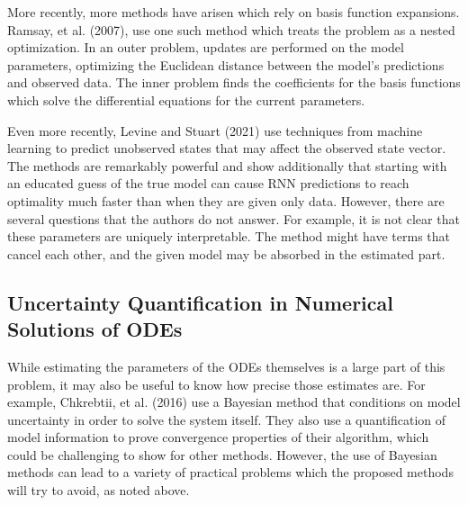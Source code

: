 \documentclass[12pt]{article}
\begin{document}

More recently, more methods have arisen which rely on basis function expansions. Ramsay, et al. (2007), use one such method which treats the problem as a nested optimization. In an outer problem, updates are performed on the model parameters, optimizing the Euclidean distance between the model's predictions and observed data. The inner problem finds the coefficients for the basis functions which solve the differential equations for the current parameters.\cite{ramsay}

Even more recently, Levine and Stuart (2021) use techniques from machine learning to predict unobserved states that may affect the observed state vector. The methods are remarkably powerful and show additionally that starting with an educated guess of the true model can cause RNN predictions to reach optimality much faster than when they are given only data.\cite{levine} However, there are several questions that the authors do not answer. For example, it is not clear that these parameters are uniquely interpretable. The method might have terms that cancel each other, and the given model may be absorbed in the estimated part.



\subsection{Uncertainty Quantification in Numerical Solutions of ODEs}

While estimating the parameters of the ODEs themselves is a large part of this problem, it may also be useful to know how precise those estimates are. For example, Chkrebtii, et al. (2016) use a Bayesian method that conditions on model uncertainty in order to solve the system itself. They also use a quantification of model information to prove convergence properties of their algorithm, which could be challenging to show for other methods.\cite{chkrebtii} However, the use of Bayesian methods can lead to a variety of practical problems which the proposed methods will try to avoid, as noted above.
\end{document}
